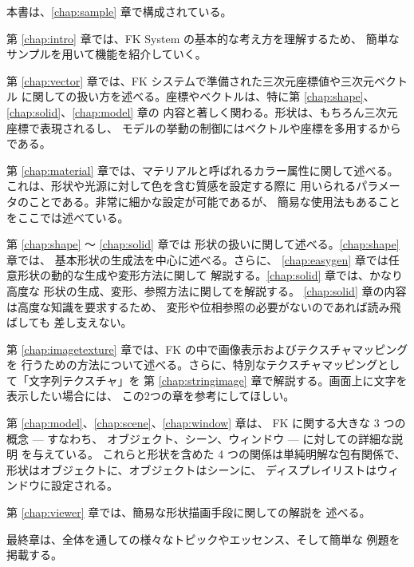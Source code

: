 本書は、\ref{chap:sample} 章で構成されている。

第 \ref{chap:intro} 章では、FK System の基本的な考え方を理解するため、
簡単なサンプルを用いて機能を紹介していく。

第 \ref{chap:vector} 章では、FK システムで準備された三次元座標値や三次元ベクトル
に関しての扱い方を述べる。座標やベクトルは、特に第 \ref{chap:shape}、
\ref{chap:solid}、\ref{chap:model} 章の
内容と著しく関わる。形状は、もちろん三次元座標で表現されるし、
モデルの挙動の制御にはベクトルや座標を多用するからである。

第 \ref{chap:material} 章では、マテリアルと呼ばれるカラー属性に関して述べる。
これは、形状や光源に対して色を含む質感を設定する際に
用いられるパラメータのことである。非常に細かな設定が可能であるが、
簡易な使用法もあることをここでは述べている。

第 \ref{chap:shape} 〜 \ref{chap:solid} 章では
形状の扱いに関して述べる。\ref{chap:shape} 章では、
基本形状の生成法を中心に述べる。さらに、
\ref{chap:easygen} 章では任意形状の動的な生成や変形方法に関して
解説する。\ref{chap:solid} 章では、かなり高度な
形状の生成、変形、参照方法に関してを解説する。
\ref{chap:solid} 章の内容は高度な知識を要求するため、
変形や位相参照の必要がないのであれば読み飛ばしても
差し支えない。

第 \ref{chap:imagetexture} 章では、FK の中で画像表示およびテクスチャマッピングを
行うための方法について述べる。さらに、特別なテクスチャマッピングとして「文字列テクスチャ」を
第 \ref{chap:stringimage} 章で解説する。画面上に文字を表示したい場合には、
この2つの章を参考にしてほしい。

第 \ref{chap:model}、\ref{chap:scene}、\ref{chap:window} 章は、
FK に関する大きな 3 つの概念 --- すなわち、
オブジェクト、シーン、ウィンドウ --- に対しての詳細な説明
を与えている。
これらと形状を含めた 4 つの関係は単純明解な包有関係で、
形状はオブジェクトに、オブジェクトはシーンに、
ディスプレイリストはウィンドウに設定される。

第 \ref{chap:viewer} 章では、簡易な形状描画手段に関しての解説を
述べる。

最終章は、全体を通しての様々なトピックやエッセンス、そして簡単な
例題を掲載する。
